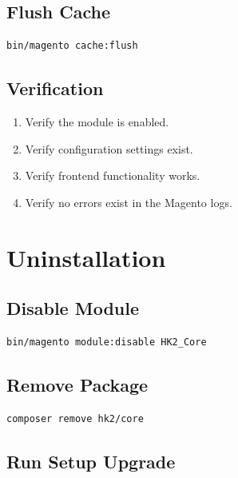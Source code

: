 \documentclass[11pt,a4paper]{article}
\begin{document}
\subsection{Flush Cache}

\begin{lstlisting}[style=shell]
bin/magento cache:flush
\end{lstlisting}

\subsection{Verification}

\begin{enumerate}
    \item Verify the module is enabled.
    \item Verify configuration settings exist.
    \item Verify frontend functionality works.
    \item Verify no errors exist in the Magento logs.
\end{enumerate}

\section{Uninstallation}

\subsection{Disable Module}

\begin{lstlisting}[style=shell]
bin/magento module:disable HK2_Core
\end{lstlisting}

\subsection{Remove Package}

\begin{lstlisting}[style=shell]
composer remove hk2/core
\end{lstlisting}

\subsection{Run Setup Upgrade}
\end{document}
